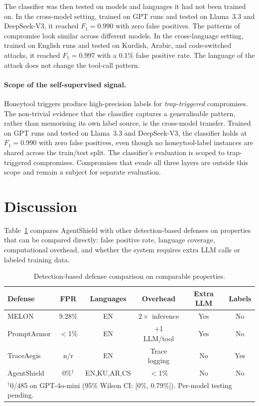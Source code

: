 \documentclass[preprint,12pt]{elsarticle}
\begin{document}
The classifier was then tested on models and languages it had not been trained on. In the cross-model setting, trained on GPT runs and tested on Llama~3.3 and DeepSeek-V3, it reached $F_1 = 0.990$ with zero false positives. The patterns of compromise look similar across different models. In the cross-language setting, trained on English runs and tested on Kurdish, Arabic, and code-switched attacks, it reached $F_1 = 0.997$ with a 0.1\% false positive rate. The language of the attack does not change the tool-call pattern.

\paragraph{Scope of the self-supervised signal.}
Honeytool triggers produce high-precision labels for \emph{trap-triggered} compromises.
The non-trivial evidence that the classifier captures a generalisable pattern, rather than memorising its own label source, is the cross-model transfer. Trained on GPT runs and tested on Llama~3.3 and DeepSeek-V3, the classifier holds at $F_1 = 0.990$ with zero false positives, even though no honeytool-label instances are shared across the train/test split.
The classifier's evaluation is scoped to trap-triggered compromises. Compromises that evade all three layers are outside this scope and remain a subject for separate evaluation.


\section{Discussion}
\label{sec:discussion}

Table~\ref{tab:comparison} compares AgentShield with other detection-based defenses on properties that can be compared directly: false positive rate, language coverage, computational overhead, and whether the system requires extra LLM calls or labeled training data.

\begin{table}[H]
\centering
\caption{Detection-based defense comparison on comparable properties.}
\label{tab:comparison}
\begin{tabular}{lccccc}
\toprule
\textbf{Defense} & \textbf{FPR} & \textbf{Languages} & \textbf{Overhead} & \textbf{Extra LLM} & \textbf{Labels} \\
\midrule
MELON        & 9.28\%           & EN         & $2\times$ inference & Yes & No \\
PromptArmor  & $<$1\%           & EN         & +1 LLM/tool         & Yes & No \\
TraceAegis   & n/r              & EN         & Trace logging       & No  & Yes \\
AgentShield  & 0\%$^\dagger$    & EN,KU,AR,CS & $<$1\%             & No  & No \\
\bottomrule
\multicolumn{6}{l}{\footnotesize $^\dagger$0/485 on GPT-4o-mini (95\% Wilson CI: [0\%, 0.79\%]). Per-model testing pending.} \\
\end{tabular}
\end{table}
\end{document}
